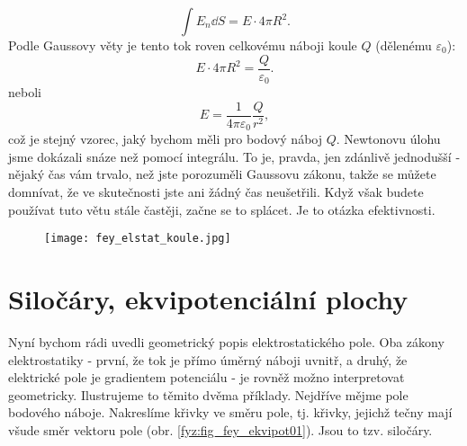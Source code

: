     \begin{equation*}
      \int E_n\dd{S} = E\cdot4\pi R^2.
    \end{equation*} 
    Podle Gaussovy věty je tento tok roven celkovému náboji koule \(Q\) (dělenému \(\varepsilon_0\)):
    \begin{equation*}
      E\cdot4\pi R^2 = \frac{Q}{\varepsilon_0}.
    \end{equation*} 
    neboli
    \begin{equation*}
      E  = \frac{1}{4\pi\varepsilon_0}\frac{Q}{r^2},
    \end{equation*}
    \noindent což je stejný vzorec, jaký bychom měli pro bodový náboj \(Q\). Newtonovu úlohu jsme 
    dokázali snáze než pomocí integrálu. To je, pravda, jen zdánlivě jednodušší - nějaký čas vám 
    trvalo, než jste porozuměli Gaussovu zákonu, takže se můžete domnívat, že ve skutečnosti jste 
    ani žádný čas neušetřili. Když však budete používat tuto větu stále častěji, začne se to 
    splácet. Je to otázka efektivnosti.    
    \begin{figure}[ht!]
      \centering
      \texttt{[image: fey\_elstat\_koule.jpg]}
      \label{fyz:fig_fey_elstat_koule}  
    \end{figure}
   

  \section{Siločáry, ekvipotenciální plochy}  
    \cite[s.~78]{Feynman02} Nyní bychom rádi uvedli geometrický popis elektrostatického pole. Oba 
    zákony elektrostatiky - první, že tok je přímo úměrný náboji uvnitř, a druhý, že elektrické pole 
    je gradientem potenciálu - je rovněž možno interpretovat geometricky. Ilustrujeme to těmito 
    dvěma příklady. Nejdříve mějme pole bodového náboje. Nakreslíme křivky ve směru pole, tj. 
    křivky, jejichž tečny mají všude směr vektoru pole (obr. \ref{fyz:fig_fey_ekvipot01}). Jsou to 
    tzv. siločáry.
    
